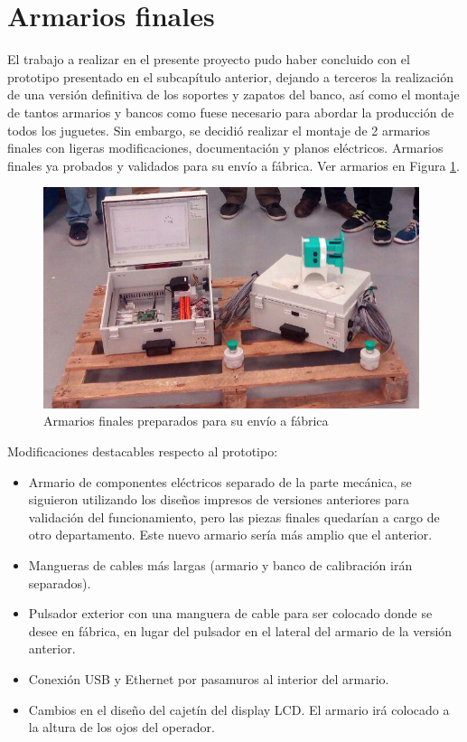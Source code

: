 
\section{Armarios finales}

El trabajo a realizar en el presente proyecto pudo haber concluido con el prototipo presentado en el subcapítulo anterior, dejando a terceros la realización de una versión definitiva de los soportes y zapatos del banco, así como el montaje de tantos armarios y bancos como fuese necesario para abordar la producción de todos los juguetes. Sin embargo, se decidió realizar el montaje de 2 armarios finales con ligeras modificaciones, documentación y planos eléctricos. Armarios finales ya probados y validados para su envío a fábrica. Ver armarios en Figura \ref{fig:armariosFinales}.

\begin{figure}
\centering
\includegraphics[width=110mm]{Figures/armariosFinales}
\caption{Armarios finales preparados para su envío a fábrica}
\label{fig:armariosFinales}
\end{figure}

Modificaciones destacables respecto al prototipo:
\begin{itemize}
  \item Armario de componentes eléctricos separado de la parte mecánica, se siguieron utilizando los diseños impresos de versiones anteriores para validación del funcionamiento, pero las piezas finales quedarían a cargo de otro departamento. Este nuevo armario sería más amplio que el anterior.
  \item Mangueras de cables más largas (armario y banco de calibración irán separados).
  \item Pulsador exterior con una manguera de cable para ser colocado donde se desee en fábrica, en lugar del pulsador en el lateral del armario de la versión anterior.
  \item Conexión USB y Ethernet por pasamuros al interior del armario.
  \item Cambios en el diseño del cajetín del display LCD. El armario irá colocado a la altura de los ojos del operador.
\end{itemize}


